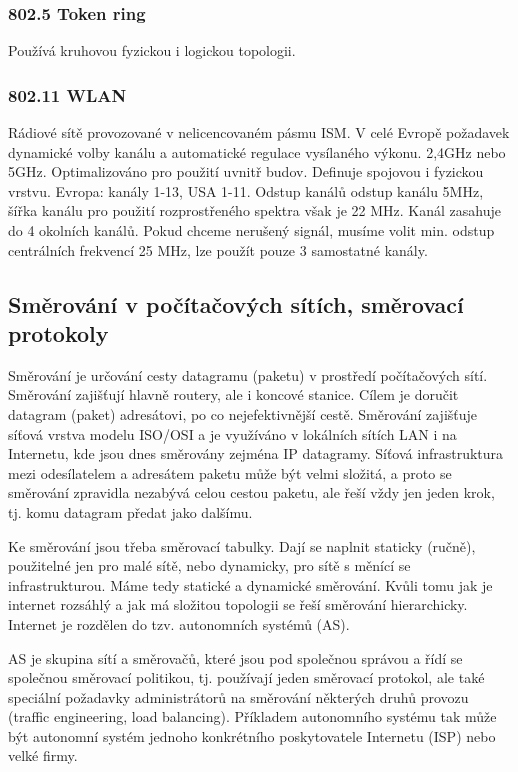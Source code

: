 \subsubsection{802.5 Token ring} 
Používá kruhovou fyzickou i logickou topologii.
\subsubsection{802.11 WLAN}
Rádiové sítě provozované v nelicencovaném pásmu ISM. V celé Evropě požadavek dynamické volby kanálu a automatické regulace vysílaného výkonu. 2,4GHz nebo 5GHz. Optimalizováno pro použití uvnitř budov. Definuje spojovou i fyzickou vrstvu. Evropa: kanály 1-13, USA 1-11. Odstup kanálů odstup kanálu 5MHz, 
šířka kanálu pro použití rozprostřeného spektra však je 22 MHz. Kanál zasahuje do 4 okolních kanálů. Pokud chceme nerušený signál, musíme volit min. odstup centrálních frekvencí 25 MHz, lze použít pouze 3 samostatné kanály.

\subsection{Směrování v počítačových sítích, směrovací protokoly}
Směrování je určování cesty datagramu (paketu) v prostředí počítačových sítí. Směrování zajišťují hlavně routery, ale i koncové stanice. Cílem je doručit datagram (paket) adresátovi, po co nejefektivnější cestě. Směrování zajišťuje síťová vrstva modelu ISO/OSI a je využíváno v lokálních sítích LAN i na Internetu, kde jsou dnes směrovány zejména IP datagramy. Síťová infrastruktura mezi odesílatelem a adresátem paketu může být velmi složitá, a proto se směrování zpravidla nezabývá celou cestou paketu, ale řeší vždy jen jeden krok, tj. komu datagram předat jako dalšímu. 

Ke směrování jsou třeba směrovací tabulky. Dají se naplnit staticky (ručně), použitelné jen pro malé sítě, nebo dynamicky, pro sítě s měnící se infrastrukturou. Máme tedy statické a dynamické směrování. Kvůli tomu jak je internet rozsáhlý a jak má složitou topologii se řeší směrování hierarchicky. Internet je rozdělen do tzv. autonomních systémů (AS). 

AS je skupina sítí a směrovačů, které jsou pod společnou správou a řídí se společnou směrovací politikou, tj. používají jeden směrovací protokol, ale také speciální požadavky administrátorů na směrování některých druhů provozu (traffic engineering, load balancing). Příkladem autonomního systému tak může být autonomní systém jednoho konkrétního poskytovatele Internetu (ISP) nebo velké firmy.

